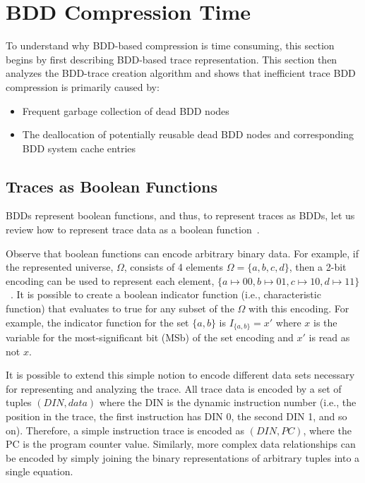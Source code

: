 \documentclass[defaultstyle,11pt]{thesis}
\begin{document}
\section{BDD Compression Time}
\label{sec:bddwork}

To understand why BDD-based compression is time consuming, this
section begins by first describing BDD-based trace
representation\cite{price:06:cal}. This section then analyzes the
BDD-trace creation algorithm and shows that inefficient trace BDD
compression is primarily caused by:

\begin{itemize}
\item Frequent garbage collection of dead BDD nodes
\item The deallocation of potentially reusable dead BDD nodes and
  corresponding BDD system cache entries
\end{itemize}

\subsection{Traces as Boolean Functions}

BDDs represent boolean functions, and thus, to represent traces as
BDDs, let us review how to represent trace data as a boolean
function~\cite{price:06:cal}.

Observe that boolean functions can encode arbitrary binary data.  For
example, if the represented universe, $\Omega$, consists of 4 elements
$\Omega = \{a,b,c,d\}$, then a 2-bit encoding can be used to represent
each element, $\{a \mapsto 00, b \mapsto 01, c \mapsto 10, d \mapsto
11\}$~\cite{price:06:cal}.  It is possible to create a boolean
indicator function (i.e., characteristic function) that evaluates to
true for any subset of the $\Omega$ with this encoding.  For example,
the indicator function for the set $\{a,b\}$ is $I_{\{a,b\}} = x'$
where $x$ is the variable for the most-significant bit (MSb) of the
set encoding and $x'$ is read as not $x$.

\newcommand{\DIN}{\ensuremath{\mathrm{DIN}}}
\newcommand{\PC}{\ensuremath{\mathrm{PC}}}

It is possible to extend this simple notion to encode different data
sets necessary for representing and analyzing the trace.  All trace
data is encoded by a set of tuples $(DIN,data)$ where the DIN is the
dynamic instruction number (i.e., the position in the trace, the first
instruction has DIN 0, the second DIN 1, and so on).  Therefore, a
simple instruction trace is encoded as $(DIN,PC)$, where the PC is the
program counter value. Similarly, more complex data relationships can
be encoded by simply joining the binary representations of arbitrary
tuples into a single equation.
\end{document}
